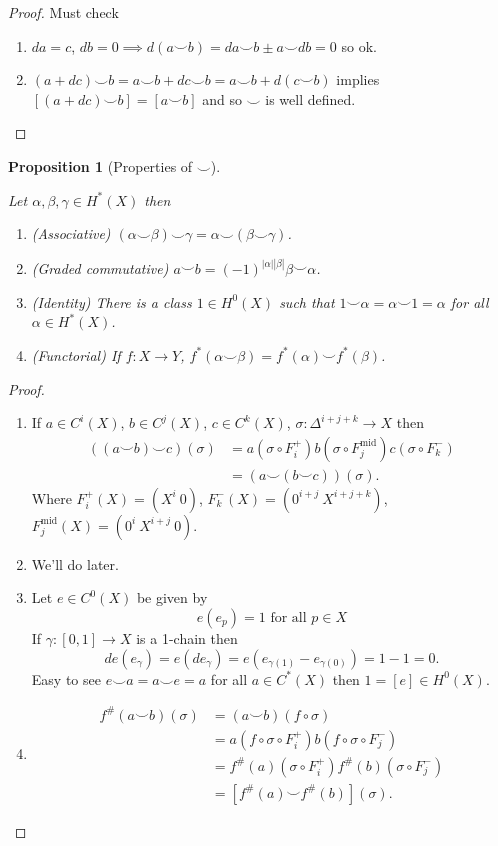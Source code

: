 \documentclass[10pt,]{book}
\theoremstyle{plain}
\newtheorem{proposition}[theorem]{Proposition}
\theoremstyle{definition}
\numberwithin{equation}{section}
\begin{document}
\begin{proof}
Must check
            \begin{enumerate}
\item{}\(da = c\), \(db = 0 \implies d(a\smile b) = da \smile b \pm a \smile db =0\) so ok.\item{}\((a+dc)\smile b = a\smile b + dc\smile b = a\smile b + d(c\smile b)\) implies \([(a + dc)\smile b] = [a\smile b]\) and so \(\smile\) is well defined.\end{enumerate}
\end{proof}
\begin{proposition}[Properties of \(\smile\)]\label{proposition-5}

            Let \(\alpha,\beta,\gamma \in H^*(X)\) then
            \begin{enumerate}
\item{}(Associative) \((\alpha\smile \beta)\smile \gamma = \alpha \smile (\beta \smile \gamma)\).\item{}(Graded commutative) \(a \smile b = (-1)^{|\alpha||\beta|}\beta \smile \alpha\).\item{}(Identity) There is a class \(1 \in H^0(X)\) such that \(1\smile \alpha = \alpha \smile 1 = \alpha\) for all \(\alpha \in H^*(X)\).\item{}(Functorial) If \(f \colon X \to Y\), \(f^*(\alpha\smile \beta) = f^*(\alpha) \smile f^*(\beta)\).\end{enumerate}
\end{proposition}
\begin{proof}
\begin{enumerate}
\item{}If \(a \in C^i(X)\), \(b \in C^j(X)\), \(c \in C^k(X)\), \(\sigma\colon\Delta^{i+j+k} \to X\) then
                \begin{align*}
 ((a\smile b) \smile c)(\sigma) &= a(\sigma\circ F_i^+) b(\sigma \circ F_j^{\text{mid}})c(\sigma\circ F_k^-)\\
&= (a \smile (b \smile c))(\sigma).
\end{align*}
                Where \(F_i^+(X) = (X^i\ 0)\), \(F_k^-(X) = (0^{i+j}\ X^{i+j+k})\), \(F_j^{\text{mid}}(X) = (0^i\ X^{i+j}\ 0)\).
              \item{}We'll do later.\item{}Let \(e\in C^0(X)\) be given by
                \[ e(e_p) = 1 \text{ for all } p \in X\]
                If \(\gamma\colon [0,1] \to X\) is a 1-chain then
                \[ de(e_\gamma) = e(de_\gamma) = e(e_{\gamma(1)} - e_{\gamma(0)}) = 1- 1 =0.\]
                Easy to see \(e \smile a = a \smile e = a\) for all \(a \in C^*(X)\) then \(1 = [e] \in H^0(X)\).
              \item{}
                \begin{align*}
f^\#(a\smile b)(\sigma) &= (a\smile b)( f\circ \sigma)\\
&= a(f\circ \sigma \circ F_i^+) b(f\circ \sigma \circ F_j^-)\\
&=f^\#(a)(\sigma \circ F_i^+)f^\#(b)(\sigma\circ F_j^-)\\
&= [f^\# (a)\smile f^\#(b)](\sigma).
\end{align*}
              \end{enumerate}
\end{proof}
\end{document}
